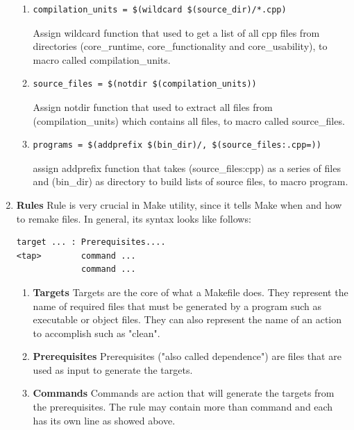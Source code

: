 \documentclass[11pt]{report}
\begin{document}
\begin{enumerate}
\begin{enumerate}
\item \begin{verbatim}
compilation_units = $(wildcard $(source_dir)/*.cpp)
\end{verbatim}
Assign wildcard function that used to get a list of all cpp files from directories (core\_runtime, core\_functionality and core\_usability), to macro called compilation\_units.

\item \begin{verbatim}
source_files = $(notdir $(compilation_units))
\end{verbatim}
Assign notdir function that used to extract all files from (compilation\_units) which contains all files, to macro called source\_files.

\item \begin{verbatim}
programs = $(addprefix $(bin_dir)/, $(source_files:.cpp=))
\end{verbatim}
assign addprefix function that takes (source\_files:cpp) as a series of files and (bin\_dir) as directory to build lists of source files, to macro program.
\end{enumerate}

\item \textbf{Rules} Rule is very crucial in Make utility, since it tells Make when and how to remake files. In general, its syntax looks like follows:
\begin{verbatim}
target ... : Prerequisites....
<tap>        command ...
             command ...
\end{verbatim}

\begin{enumerate}
\item \textbf{Targets} Targets are the core of what a Makefile does. They represent the name of required files that must be generated by a program such as executable or object files. They can also represent the name of an action to accomplish such as "clean".

\item \textbf{Prerequisites} Prerequisites ("also called dependence") are files that are used as input to generate the targets.

\item \textbf{Commands} Commands are action that will generate the targets from the prerequisites. The rule may contain more than command and each has its own line as showed above.
\end{enumerate}


\end{enumerate}
\end{document}
